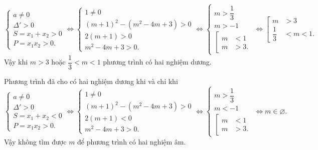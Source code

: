 {\begin{enumEX}{1}
			$\begin{cases} a \ne 0\\ \Delta' >0\\ S= x_1+x_2>0\\ P=x_1x_2>0. \end{cases} \Leftrightarrow \begin{cases} 1\ne 0\\ (m+1)^2 -  (m^2 -4m +3) >0\\ 2(m+1) >0\\ m^2-4m +3>0. \end{cases} \Leftrightarrow \begin{cases} m> \dfrac{1}{3}\\ m>-1\\ \left[\begin{aligned} m & <1\\ m &>3. \end{aligned}\right. \end{cases} \Leftrightarrow \left[\begin{aligned} m & >3\\ \dfrac{1}{3}&<m<1. \end{aligned}\right.$\\
			Vậy khi $m> 3$ hoặc $\dfrac{1}{3}< m< 1$ phương trình có hai nghiệm dương.
			\item Phương trình đã cho có hai nghiệm dương khi và chỉ khi \\
			$\begin{cases} a \ne 0\\ \Delta' >0\\ S= x_1+x_2<0\\ P=x_1x_2>0. \end{cases} \Leftrightarrow \begin{cases} 1\ne 0\\ (m+1)^2 -  (m^2 -4m +3) >0\\ 2(m+1) <0\\ m^2-4m +3>0. \end{cases} \Leftrightarrow \begin{cases} m> \dfrac{1}{3}\\ m<-1\\ \left[\begin{aligned} m & <1\\ m &>3. \end{aligned}\right. \end{cases} \Leftrightarrow m \in \varnothing.$\\
			Vậy không tìm được $m$ để phương trình có hai nghiệm âm.
	\end{enumEX}}
	

